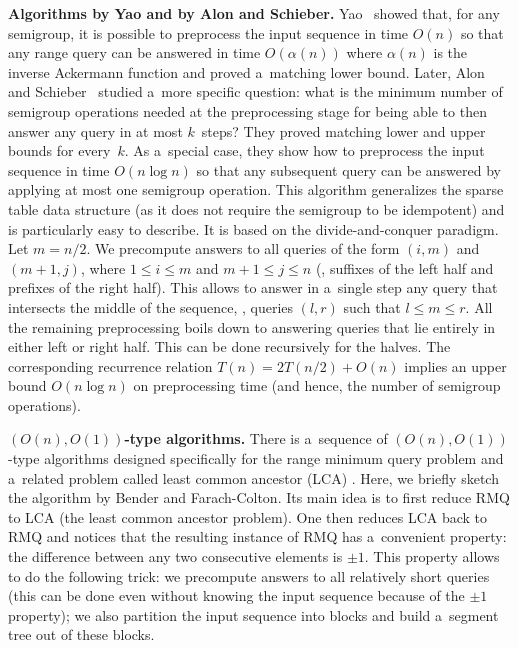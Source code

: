 \documentclass{toc}
\begin{document}
\textbf{Algorithms by Yao and by Alon and Schieber.}
Yao~\cite{DBLP:conf/stoc/Yao82} showed that, for any semigroup, it is possible
to preprocess the input sequence in time $O(n)$ so that
%
%
%
any range query can be answered %
%
in time $O(\alpha(n))$ where $\alpha(n)$ is the inverse Ackermann function
and proved a~matching lower bound. Later, Alon and
Schieber~\cite{Alon87optimalpreprocessing} studied a~more specific question:
what is the minimum number of semigroup operations needed at the preprocessing
stage for being able to then answer any query in at most $k$~steps? They proved
matching lower and upper bounds for every~$k$. As a~special case, they show how
to preprocess the input sequence in time $O(n\log n)$ so that %
any subsequent query
can be answered %
by applying at most one semigroup operation. This algorithm
generalizes the sparse table data structure (as it does not require the
semigroup to be idempotent) and is particularly easy to describe. It is based on
the divide-and-conquer paradigm. Let $m=n/2$. We precompute answers to all
queries of the form $(i,m)$ and $(m+1,j)$, where $1 \le i \le m$ and
$m+1 \le j \le n$ (\ie, suffixes of the left half and prefixes of the right
half). This allows to answer in a~single step any query that intersects the
middle of the sequence, \ie, queries $(l,r)$ such that $l \le m \le r$. All the
remaining preprocessing boils down to answering queries that lie entirely in
either left or right half. This can be done recursively for the halves. The
corresponding recurrence relation $T(n)=2T(n/2)+O(n)$ implies an upper bound
$O(n\log n)$ on preprocessing time (and hence, the number of semigroup
operations).

\textbf{$(O(n), O(1))$-type algorithms.}
There is a~sequence of $(O(n), O(1))$-type algorithms designed specifically
%
for  %
the range minimum query problem and a~related problem called least common
ancestor (LCA) \cite{DBLP:journals/siamcomp/BerkmanV93,
    DBLP:journals/jal/BenderFPSS05,
    DBLP:conf/latin/BenderF00,
    DBLP:conf/cpm/FischerH06}. Here, we briefly sketch the algorithm by Bender and
Farach-Colton. Its main idea is to first reduce RMQ to LCA (the least common
ancestor problem). One then reduces LCA back to RMQ and notices that the
resulting instance of RMQ has a~convenient property: the difference between any
two consecutive elements is $\pm 1$. This property allows to do the following
trick: we precompute answers to all relatively short queries (this can be done
even without knowing the input sequence because of the $\pm 1$ property); we
also partition the input sequence into blocks and build a~segment tree out of
these blocks.
\end{document}
